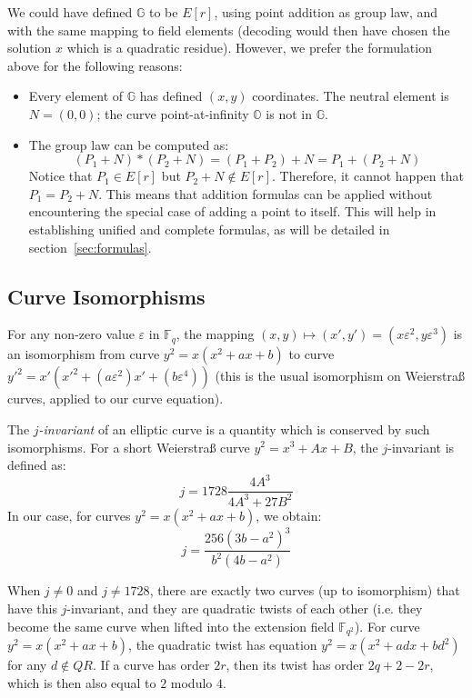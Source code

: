 \documentclass{llncs}
\newcommand{\QR}{QR}
\newcommand{\bF}{\mathbb{F}}
\newcommand{\bG}{\mathbb{G}}
\newcommand{\neutral}{\mathbb{O}}
\begin{document}
We could have defined $\bG$ to be $E[r]$, using point addition as group
law, and with the same mapping to field elements (decoding would then have
chosen the solution $x$ which is a quadratic residue). However, we
prefer the formulation above for the following reasons:
\begin{itemize}

    \item Every element of $\bG$ has defined $(x,y)$ coordinates. The
    neutral element is $N = (0,0)$; the curve point-at-infinity $\neutral$
    is not in $\bG$.

    \item The group law can be computed as:
    \begin{equation*}
        (P_1 + N) * (P_2 + N) = (P_1 + P_2) + N = P_1 + (P_2 + N)
    \end{equation*}
    Notice that $P_1 \in E[r]$ but $P_2 + N \notin E[r]$. Therefore, it
    cannot happen that $P_1 = P_2 + N$. This means that addition
    formulas can be applied without encountering the special case of
    adding a point to itself. This will help in establishing unified and
    complete formulas, as will be detailed in section~\ref{sec:formulas}.

\end{itemize}

\subsection{Curve Isomorphisms}\label{sec:structure:isomorphism}

For any non-zero value $\varepsilon$ in $\bF_q$, the mapping
$(x,y) \mapsto (x',y') = (x\varepsilon^2, y\varepsilon^3)$ is an isomorphism
from curve $y^2 = x(x^2+ax+b)$ to curve
$y'^2 = x'(x'^2 + (a\varepsilon^2)x' + (b\varepsilon^4))$ (this is the usual
isomorphism on Weierstraß curves, applied to our curve equation).

The \emph{$j$-invariant} of an elliptic curve is a quantity which is
conserved by such isomorphisms. For a short Weierstraß curve
$y^2 = x^3 + Ax + B$, the $j$-invariant is defined as:
    $$ j = 1728 \frac{4A^3}{4A^3 + 27B^2} $$
In our case, for curves $y^2 = x(x^2 + ax + b)$, we obtain:
    $$ j = \frac{256 (3b - a^2)^3}{b^2(4b - a^2)} $$

When $j \neq 0$ and $j\neq 1728$, there are exactly two curves (up to
isomorphism) that have this $j$-invariant, and they are quadratic twists
of each other (i.e. they become the same curve when lifted into the
extension field $\bF_{q^2}$). For curve $y^2 = x(x^2 + ax + b)$, the
quadratic twist has equation $y^2 = x(x^2 + adx + bd^2)$ for any
$d\notin\QR$. If a curve has order $2r$, then its twist has order
$2q + 2 - 2r$, which is then also equal to $2$ modulo $4$.
\end{document}

